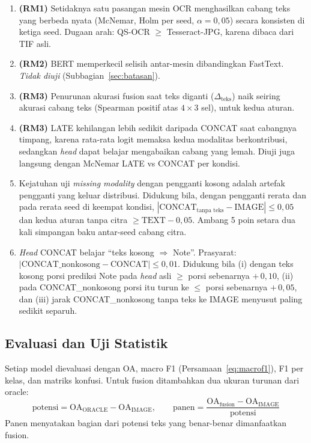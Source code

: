 \begin{enumerate}[label=\textbf{H\arabic*},leftmargin=1.4cm,labelwidth=1.2cm]
  \item[\textbf{H1}] \textbf{(RM1)} Setidaknya satu pasangan mesin OCR menghasilkan cabang
  teks yang berbeda nyata (McNemar, Holm per seed, $\alpha = 0{,}05$) secara konsisten di
  ketiga seed. Dugaan arah: QS-OCR $\geq$ Tesseract-JPG, karena dibaca dari TIF asli.
  \item[\textbf{H2}] \textbf{(RM2)} BERT memperkecil selisih antar-mesin dibandingkan
  FastText. \emph{Tidak diuji} (Subbagian~\ref{sec:batasan}).
  \item[\textbf{H3a}] \textbf{(RM3)} Penurunan akurasi fusion saat teks diganti
  ($\Delta_\text{teks}$) naik seiring akurasi cabang teks (Spearman positif atas
  $4 \times 3$ sel), untuk kedua aturan.
  \item[\textbf{H3b}] \textbf{(RM3)} LATE kehilangan lebih sedikit daripada CONCAT saat
  cabangnya timpang, karena rata-rata logit memaksa kedua modalitas berkontribusi,
  sedangkan \textit{head} dapat belajar mengabaikan cabang yang lemah. Diuji juga langsung
  dengan McNemar LATE vs CONCAT per kondisi.
  \item[\textbf{H4a}] Kejatuhan uji \textit{missing modality} dengan pengganti kosong adalah
  artefak pengganti yang keluar distribusi. Didukung bila, dengan pengganti rerata dan
  pada rerata seed di keempat kondisi,
  $|\text{CONCAT}_\text{tanpa teks} - \text{IMAGE}| \leq 0{,}05$ dan kedua aturan tanpa
  citra $\geq \text{TEXT} - 0{,}05$. Ambang 5 poin setara dua kali simpangan baku
  antar-seed cabang citra.
  \item[\textbf{H4b}] \textit{Head} CONCAT belajar \enquote{teks kosong $\Rightarrow$
  Note}. Prasyarat: $|\text{CONCAT\_nonkosong} - \text{CONCAT}| \leq 0{,}01$. Didukung
  bila (i) dengan teks kosong porsi prediksi Note pada \textit{head} asli $\geq$ porsi
  sebenarnya $+\,0{,}10$, (ii) pada CONCAT\_nonkosong porsi itu turun ke $\leq$ porsi
  sebenarnya $+\,0{,}05$, dan (iii) jarak CONCAT\_nonkosong tanpa teks ke IMAGE menyusut
  paling sedikit separuh.
\end{enumerate}

\subsection{Evaluasi dan Uji Statistik}\label{sec:evaluasi}

Setiap model dievaluasi dengan OA, macro F1 (Persamaan~\ref{eq:macrof1}), F1 per kelas,
dan matriks konfusi. Untuk fusion ditambahkan dua ukuran turunan dari oracle:
\begin{equation}\label{eq:panen}
  \text{potensi} = \mathrm{OA}_\text{ORACLE} - \mathrm{OA}_\text{IMAGE}, \qquad
  \text{panen} = \frac{\mathrm{OA}_\text{fusion} - \mathrm{OA}_\text{IMAGE}}{\text{potensi}}
\end{equation}
Panen menyatakan bagian dari potensi teks yang benar-benar dimanfaatkan fusion.

